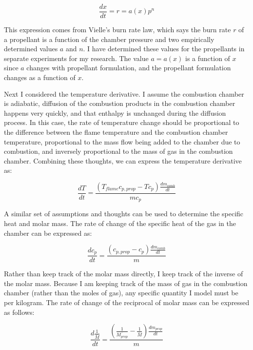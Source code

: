 \documentclass[12pt, letterpaper]{article}
\begin{document}
\begin{equation}
  \frac{dx}{dt} = r = a(x) p^n
\end{equation}

This expression comes from Vielle's burn rate law, which says the burn rate $r$ of a propellant is a function of the chamber pressure and two empirically determined values $a$ and $n$. I have determined these values for the propellants in separate experiments for my research. The value $a = a(x)$ is a function of $x$ since $a$ changes with propellant formulation, and the propellant formulation changes as a function of $x$. 

Next I considered the temperature derivative. I assume the combustion chamber is adiabatic, diffusion of the combustion products in the combustion chamber happens very quickly, and that enthalpy is unchanged during the diffusion process. In this case, the rate of temperature change should be proportional to the difference between the flame temperature and the combustion chamber temperature, proportional to the mass flow being added to the chamber due to combustion, and inversely proportional to the mass of gas in the combustion chamber. Combining these thoughts, we can express the temperature derivative as:

\begin{equation}
  \frac{dT}{dt} = \frac{\left( T_{flame} c_{p, prop} - T c_p \right) \frac{dm_{comb}}{dt}}{m c_p}
\end{equation} 

A similar set of assumptions and thoughts can be used to determine the specific heat and molar mass. The rate of change of the specific heat of the gas in the chamber can be expressed as:

\begin{equation}
  \frac{d c_p}{dt} = \frac{\left( c_{p, prop} - c_p \right) \frac{dm_{comb}}{dt}}{m}
\end{equation}

Rather than keep track of the molar mass directly, I keep track of the inverse of the molar mass. Because I am keeping track of the mass of gas in the combustion chamber (rather than the moles of gas), any specific quantity I model must be per kilogram. The rate of change of the reciprocal of molar mass can be expressed as follows:

\begin{equation}
  \frac{d \frac{1}{\bar{M}}}{dt} = \frac{ \left( \frac{1}{\bar{M_{prop}}} - \frac{1}{\bar{M}}\right) \frac{dm_{prop}}{dt}}{m}
\end{equation}
\end{document}
